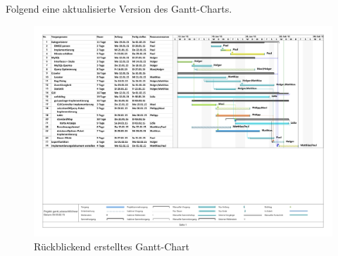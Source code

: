 Folgend eine aktualisierte Version des Gantt-Charts.

\begin{figure}[H]
	\centering
	\includegraphics[width=\textwidth]{../Gantt/gantt_neu.pdf}
	\caption{Rückblickend erstelltes Gantt-Chart}
\end{figure}
